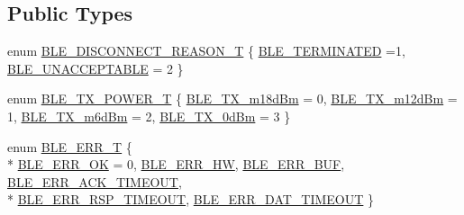 \subsection*{Public Types}
\begin{DoxyCompactItemize}
\item 
enum \hyperlink{classble_serial_a5a50139216d995997ee79d3bd058bfe6}{B\-L\-E\-\_\-\-D\-I\-S\-C\-O\-N\-N\-E\-C\-T\-\_\-\-R\-E\-A\-S\-O\-N\-\_\-\-T} \{ \hyperlink{classble_serial_a5a50139216d995997ee79d3bd058bfe6aed29c5e9584bc5b1a88b9fb00e9962f3}{B\-L\-E\-\_\-\-T\-E\-R\-M\-I\-N\-A\-T\-E\-D} =1, 
\hyperlink{classble_serial_a5a50139216d995997ee79d3bd058bfe6a81c6b69282982367c7145cb4e438a2cb}{B\-L\-E\-\_\-\-U\-N\-A\-C\-C\-E\-P\-T\-A\-B\-L\-E} = 2
 \}
\item 
enum \hyperlink{classble_serial_a5a80fa5bef696de05146980acdd68f3c}{B\-L\-E\-\_\-\-T\-X\-\_\-\-P\-O\-W\-E\-R\-\_\-\-T} \{ \hyperlink{classble_serial_a5a80fa5bef696de05146980acdd68f3ca27638a73c01d8094a95adaf459c9eb2b}{B\-L\-E\-\_\-\-T\-X\-\_\-m18d\-Bm} = 0, 
\hyperlink{classble_serial_a5a80fa5bef696de05146980acdd68f3caba061502901a1f7ea1256511ed1b2b29}{B\-L\-E\-\_\-\-T\-X\-\_\-m12d\-Bm} = 1, 
\hyperlink{classble_serial_a5a80fa5bef696de05146980acdd68f3ca858fa427361b25178ae80cb31bc4cddc}{B\-L\-E\-\_\-\-T\-X\-\_\-m6d\-Bm} = 2, 
\hyperlink{classble_serial_a5a80fa5bef696de05146980acdd68f3ca4193a6771ef19e12f25a26af196184ff}{B\-L\-E\-\_\-\-T\-X\-\_\-0d\-Bm} = 3
 \}
\item 
enum \hyperlink{classble_serial_a46e393eb31428307fde06a2788920ce2}{B\-L\-E\-\_\-\-E\-R\-R\-\_\-\-T} \{ \\*
\hyperlink{classble_serial_a46e393eb31428307fde06a2788920ce2a8cd412532141e50b0d447d2bcd997dbe}{B\-L\-E\-\_\-\-E\-R\-R\-\_\-\-O\-K} = 0, 
\hyperlink{classble_serial_a46e393eb31428307fde06a2788920ce2a276e0d38e986fe60284f6a985ac53689}{B\-L\-E\-\_\-\-E\-R\-R\-\_\-\-H\-W}, 
\hyperlink{classble_serial_a46e393eb31428307fde06a2788920ce2a17a9d88bfd8cf2ceb25a09c8e87a006b}{B\-L\-E\-\_\-\-E\-R\-R\-\_\-\-B\-U\-F}, 
\hyperlink{classble_serial_a46e393eb31428307fde06a2788920ce2ae4611cf47cef2fe6faf9f27d4e5b4ae5}{B\-L\-E\-\_\-\-E\-R\-R\-\_\-\-A\-C\-K\-\_\-\-T\-I\-M\-E\-O\-U\-T}, 
\\*
\hyperlink{classble_serial_a46e393eb31428307fde06a2788920ce2afc80c13721c45e057beb1d051378d122}{B\-L\-E\-\_\-\-E\-R\-R\-\_\-\-R\-S\-P\-\_\-\-T\-I\-M\-E\-O\-U\-T}, 
\hyperlink{classble_serial_a46e393eb31428307fde06a2788920ce2ae0166099b514f110064fb8962bf1b292}{B\-L\-E\-\_\-\-E\-R\-R\-\_\-\-D\-A\-T\-\_\-\-T\-I\-M\-E\-O\-U\-T}
 \}
\end{DoxyCompactItemize}
